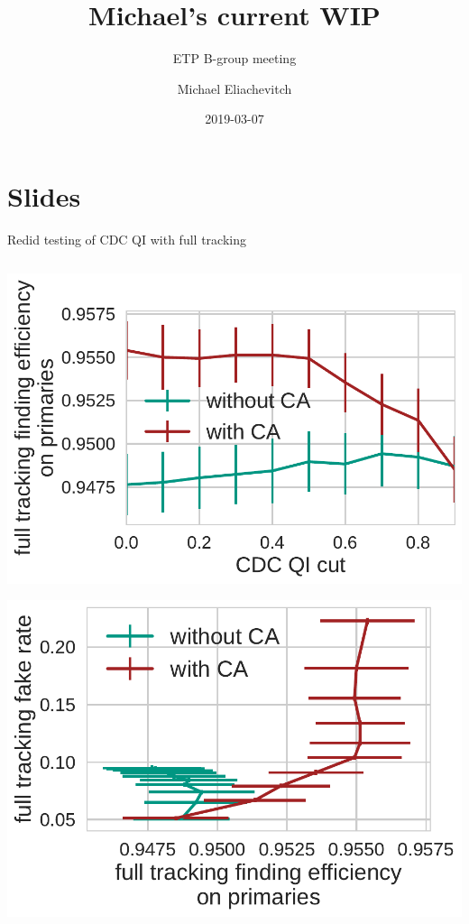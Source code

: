 \documentclass[presentation]{etp-beamer-fancy}
\author{Michael Eliachevitch}
\date{2019-03-07}
\title{Michael's current WIP}
\subtitle{ETP B-group meeting}
\institute{ETP -- KIT}
\begin{document}
\maketitle
\section*{Slides}
\label{sec:org7c4f0e0}
\begin{frame}[label={sec:org652d49d}]{Redid testing of CDC QI with full tracking}
\begin{columns}
\begin{column}{0.33\columnwidth}
\begin{center}
\includegraphics[width=\textwidth]{./figures/full-finding-efficiency-by-cdc-qi-cut.pdf}
\end{center}
\begin{center}
\includegraphics[width=\textwidth]{./figures/full-qi_roc_curve.pdf}

\end{center}
\end{column}
\end{columns}
\end{frame}
\end{document}

